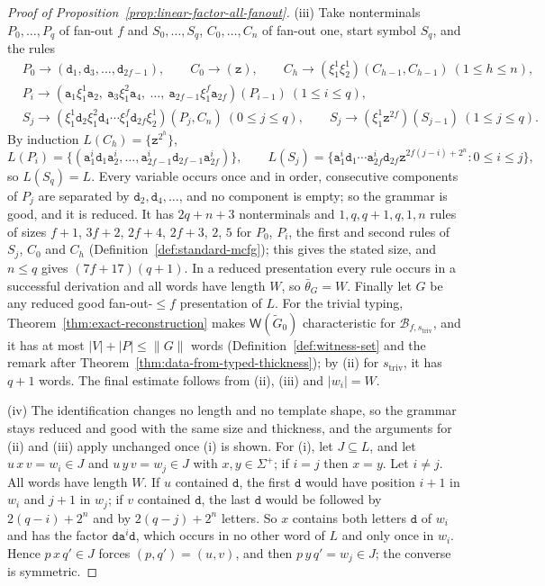 \documentclass[11pt]{article}
\numberwithin{equation}{section}
\theoremstyle{plain}
\theoremstyle{definition}
\theoremstyle{remark}
\newcommand{\Wit}{\mathsf{W}}
\theoremstyle{plain}
\begin{document}
\begin{proof}[Proof of Proposition~\ref{prop:linear-factor-all-fanout}]
(iii) Take nonterminals $P_0,\ldots,P_q$ of fan-out $f$ and $S_0,\ldots,S_q$,
$C_0,\ldots,C_n$ of fan-out one, start symbol $S_q$, and the rules
\[
\begin{aligned}
 &P_0\to(\mathtt d_1,\mathtt d_3,\ldots,\mathtt d_{2f-1}),\qquad
 C_0\to(\mathtt z),\qquad
 C_h\to(\xi_1^1\xi_2^1)(C_{h-1},C_{h-1})\ (1\le h\le n),\\
 &P_i\to(\mathtt a_1\xi_1^1\mathtt a_2,\ \mathtt a_3\xi_1^2\mathtt a_4,\ \ldots,\
 \mathtt a_{2f-1}\xi_1^f\mathtt a_{2f})(P_{i-1})\ (1\le i\le q),\\
 &S_j\to(\xi_1^1\mathtt d_2\xi_1^2\mathtt d_4\cdots\xi_1^f\mathtt d_{2f}\xi_2^1)(P_j,C_n)
 \ (0\le j\le q),\qquad
 S_j\to(\xi_1^1\mathtt z^{2f})(S_{j-1})\ (1\le j\le q).
\end{aligned}
\]
By induction $L(C_h)=\{\mathtt z^{2^h}\}$,
\[
 L(P_i)=\{(\mathtt a_1^i\mathtt d_1\mathtt a_2^i,\ldots,
 \mathtt a_{2f-1}^i\mathtt d_{2f-1}\mathtt a_{2f}^i)\},\qquad
 L(S_j)=\{\mathtt a_1^i\mathtt d_1\cdots\mathtt a_{2f}^i\mathtt d_{2f}
 \mathtt z^{2f(j-i)+2^n}:0\le i\le j\},
\]
so $L(S_q)=L$.  Every variable occurs once
and in order, consecutive components of $P_j$ are separated by
$\mathtt d_2,\mathtt d_4,\ldots$, and no component is empty; so the grammar is good,
and it is reduced.  It has $2q+n+3$ nonterminals and $1,q,q+1,q,1,n$ rules of
sizes $f+1$, $3f+2$, $2f+4$, $2f+3$, $2$, $5$ for $P_0$, $P_i$, the first and
second rules of $S_j$, $C_0$ and $C_h$ (Definition~\ref{def:standard-mcfg});
this gives the stated size, and $n\le q$ gives $(7f+17)(q+1)$.  In a reduced
presentation every rule occurs in a successful derivation and all words have
length $W$, so $\bar\theta_G=W$.  Finally let $G$ be any reduced good
fan-out-$\le f$ presentation of $L$.  For the trivial typing,
Theorem~\ref{thm:exact-reconstruction} makes $\Wit(\widetilde G_0)$
characteristic for $\mathcal B_{f,s_{\mathrm{triv}}}$, and it has at most
$|V|+|P|\le\|G\|$ words (Definition~\ref{def:witness-set} and the remark after
Theorem~\ref{thm:data-from-typed-thickness}); by (ii) for $s_{\mathrm{triv}}$, it
has $q+1$ words.  The final estimate follows from (ii), (iii) and $|w_i|=W$.

(iv) The identification changes no length and no template shape, so the grammar
stays reduced and good with the same size and thickness, and the arguments for
(ii) and (iii) apply unchanged once (i) is shown.  For (i), let $J\subseteq L$, and
let $u\,x\,v=w_i\in J$ and $u\,y\,v=w_j\in J$ with $x,y\in\Sigma^+$; if $i=j$ then
$x=y$.  Let $i\ne j$.  All words have length $W$.  If $u$ contained $\mathtt d$, the
first $\mathtt d$ would have position $i+1$ in $w_i$ and $j+1$ in $w_j$; if $v$
contained $\mathtt d$, the last $\mathtt d$ would be followed by $2(q-i)+2^n$ and by
$2(q-j)+2^n$ letters.  So $x$ contains both letters $\mathtt d$ of $w_i$ and has the
factor $\mathtt d\mathtt a^i\mathtt d$, which occurs in no other word of $L$ and only
once in $w_i$.  Hence $p\,x\,q'\in J$ forces $(p,q')=(u,v)$, and then
$p\,y\,q'=w_j\in J$; the converse is symmetric.
\end{proof}
\end{document}

